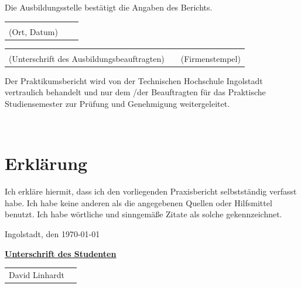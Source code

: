 \documentclass[11pt, a4paper, oneside]{scrartcl}
\begin{document}
\begin{titlepage}
        \vspace{0.5cm}
        Die Ausbildungsstelle bestätigt die Angaben des Berichts.\par
        \vspace{1.5cm}
        \noindent
        \begin{tabular}{@{}p{7cm}p{1cm}p{7cm}@{}}
            \dotfill\\
            \multicolumn{1}{l}{(Ort, Datum)}
        \end{tabular}
        \par
        \vspace{2cm}
        \noindent
        \begin{tabular}{@{}p{7cm}p{1cm}p{7cm}@{}}
            \dotfill & & \dotfill \\
            \multicolumn{1}{l}{
                (Unterschrift des Ausbildungsbeauftragten)
            } & & \multicolumn{1}{l}{
                (Firmenstempel)
            }
        \end{tabular}

        \vspace{1.5cm}
        \noindent
        Der Praktikumsbericht wird von der Technischen Hochschule Ingolstadt vertraulich behandelt
        und nur dem /der Beauftragten für das Praktische Studiensemester zur Prüfung und Genehmigung
        weitergeleitet.\par
    \end{titlepage}

    \restoregeometry\

    \section*{Erklärung}
        Ich erkläre hiermit, dass ich den vorliegenden Praxisbericht selbstständig verfasst habe.
        Ich habe keine anderen als die angegebenen Quellen oder Hilfsmittel benutzt.
        Ich habe wörtliche und sinngemäße Zitate als solche gekennzeichnet.\par
        \vspace{1em}
        Ingolstadt, den \today\par
        \vspace{1em}
        \textbf{\underline{Unterschrift des Studenten}}\par
        \vspace*{3cm}
        \begin{tabular}{@{}p{7cm}l@{}}
            \hline
            David Linhardt
        \end{tabular}
\end{document}
